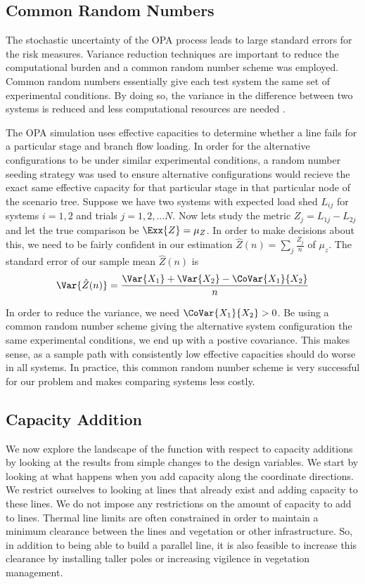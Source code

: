 \subsection{Common Random Numbers}
The stochastic uncertainty of the OPA process leads to large standard errors for the risk measures.  Variance reduction techniques are important to reduce the computational burden and a common random number scheme was employed.  Common random numbers essentially give each test system the same set of experimental conditions.  By doing so, the variance in the difference between two systems is reduced and less computational resources are needed \cite{law_2007}.

The OPA simulation uses effective capacities to determine whether a line fails for a particular stage and branch flow loading.  In order for the alternative configurations to be under similar experimental conditions, a random number seeding strategy was used to ensure alternative configurations would recieve the exact same effective capacity for that particular stage in that particular node of the scenario tree.  Suppose we have two systems with expected load shed $L_{ij}$ for systems $i=1,2$ and trials $j=1,2,...N$.  Now lets study the metric $Z_j = L_{1j} - L_{2j}$ and let the true comparison be $\Exx{Z}=\mu_Z$.  In order to make decisions about this, we need to be fairly confident in our estimation $\hat{Z}(n)=\sum_j \frac{Z_j}{n}$ of $\mu_z$.  The standard error of our sample mean $\hat{Z}(n)$ is
\begin{equation}
\Var{ \hat{Z}(n) } = \frac{ \Var{X_1} + \Var{X_2} - \CoVar{X_1}{X_2} }{n}
\end{equation}

In order to reduce the variance, we need $\CoVar{X_1}{X_2}>0$.  Be using a common random number scheme giving the alternative system configuration the same experimental conditions, we end up with a postive covariance.  This makes sense, as a sample path with consistently low effective capacities should do worse in all systems.  In practice, this common random number scheme is very successful for our problem and makes comparing systems less costly.


\subsection{Capacity Addition}
We now explore the landscape of the function with respect to capacity additions by looking at the results from simple changes to the design variables.  We start by looking at what happens when you add capacity along the coordinate directions.  We restrict ourselves to looking at lines that already exist and adding capacity to these lines.  We do not impose any restrictions on the amount of capacity to add to lines.  Thermal line limits are often constrained in order to maintain a minimum clearance between the lines and vegetation or other infrastructure.  So, in addition to being able to build a parallel line, it is also feasible to increase this clearance by installing taller poles or increasing vigilence in vegetation management.


